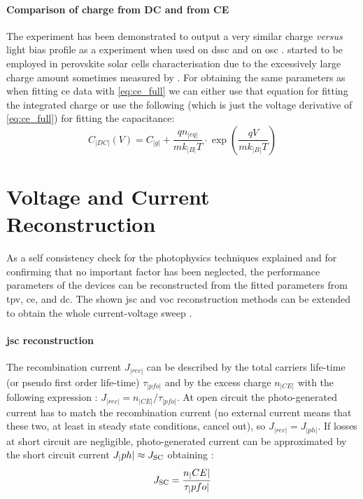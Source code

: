 	\paragraph{Comparison of charge from DC and from CE}
	The  experiment has been demonstrated to output a very similar charge \textsl{versus} light bias profile as a  experiment when used on \gls{dssc} \cite{ORegan2005,Barnes2013} and on \gls{osc} \cite{Shuttle2008a}.
	 started to be employed in perovskite solar cells characterisation due to the excessively large charge amount sometimes measured by  \cite{Wheeler2017,ORegan2015b}.
	For obtaining the same parameters as when fitting \gls{ce} data with \cref{eq:ce_full} we can either use that equation for fitting the integrated charge or use the following (which is just the voltage derivative of \cref{eq:ce_full}) for fitting the capacitance:
	\begin{equation}\label{eq:dc_full}
		C_|DC|(V) = C_|g| + \frac{qn_|eq|}{mk_|B|T} \cdot \exp(\frac{qV}{mk_|B|T})
	\end{equation}

	\FloatBarrier
	\newpage
\section{Voltage and Current Reconstruction}
	As a self consistency check for the photophysics techniques explained and for confirming that no important factor has been neglected, the performance parameters of the devices can be reconstructed from the fitted parameters from \gls{tpv}, \gls{ce}, and \gls{dc}.
	The shown \gls{jsc} and \gls{voc} reconstruction methods can be extended to obtain the whole current-voltage sweep \cite{Maurano2011}.

	\paragraph{\Gls{jsc} reconstruction}\label{jsc_reconstruction}
	The recombination current $J_|rec|$ can be described by the total carriers life\hyp{}time (or pseudo first order life\hyp{}time) $\tau_|pfo|$ and by the excess charge $n_|CE|$ with the following expression \cite{Wheeler2017,Du2018}: $J_|rec| = n_|CE| / \tau_|pfo|$.
	At open circuit the photo\hyp{}generated current has to match the recombination current (no external current means that these two, at least in steady state conditions, cancel out), so $J_|rec| = J_|ph|$.
	If losses at short circuit are negligible, photo\hyp{}generated current can be approximated by the short circuit current $J_|ph| \approx J_\mathrm{SC}$ obtaining \cite{ORegan2015b}:
	\begin{equation}\label{eq:reconstruction_jsc}
		J_\mathrm{SC} = \frac{n_|CE|}{\tau_|pfo|}
	\end{equation}

